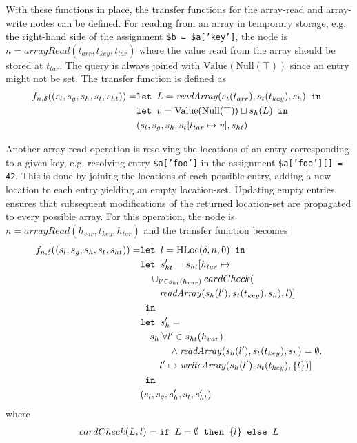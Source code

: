 With these functions in place, the transfer functions for the array-read and array-write nodes can be defined. For reading from an array in temporary storage, e.g. the right-hand side of the assignment \texttt{\$b = \$a['key']}, the node is $n = \mathit{arrayRead}(t_{arr},t_{key},t_{tar})$ where the value read from the array should be stored at $t_{tar}$. The query is always joined with $\text{Value}(\text{Null}(\top))$ since an entry might not be set. The transfer function is defined as
\begin{align}
f_{n,\delta}((s_l, s_g, s_h, s_t, s_{ht})) =   &\texttt{let } L = \mathit{readArray}(s_t(t_{arr}), s_t(t_{key}) ,s_h) \texttt{ in }\notag\\
                                    &\texttt{let } v = \text{Value}(\text{Null}(\top))\sqcup s_h(L) \texttt{ in }\notag\\
                                    &  (s_l, s_g, s_h, s_t[t_{tar}\mapsto v], s_{ht})
\end{align}

Another array-read operation is resolving the locations of an entry corresponding to a given key, e.g. resolving entry \texttt{\$a['foo']} in the assignment \texttt{\$a['foo'][] = 42}. This is done by joining the locations of each possible entry, adding a new location to each entry yielding an empty location-set. Updating empty entries ensures that subsequent modifications of the returned location-set are propagated to every possible array. For this operation, the node is $n = \mathit{arrayRead}(h_{var},t_{key},h_{tar})$ and the transfer function becomes
\begin{align}
f_{n,\delta}((s_l, s_g, s_h, s_t, s_{ht})) =   &\texttt{let } l = \text{HLoc}(\delta, n, 0) \texttt{ in }\notag\\
                                    &\texttt{let } s_{ht}' = s_{ht}[h_{tar} \mapsto \notag\\
                                    & \quad \cup_{l'\in s_{ht}(h_{var})}cardCheck(\notag\\
                                    &\quad\quad \mathit{readArray}(s_h(l'), s_t(t_{key}), s_h), l)]\notag\\
                                    & \texttt{ in }\notag\\
                                    &\texttt{let } s_h' = \notag\\
                                    &\quad s_h[\forall l' \in s_{ht}(h_{var}) \notag\\
                                    &\quad\quad\quad\wedge \mathit{readArray}(s_h(l'), s_t(t_{key}), s_h) = \emptyset.\notag\\
                                    &\quad\quad l' \mapsto \mathit{writeArray}(s_h(l'), s_t(t_{key}), \{l\})]\notag\\
                                    & \texttt{ in }\notag\\
                                    &(s_l, s_g, s_h', s_t, s_{ht}')
\end{align}
where 
\begin{align}
cardCheck(L, l) = \texttt{if }L = \emptyset\texttt{ then } \{l\} \texttt{ else } L
\end{align}

